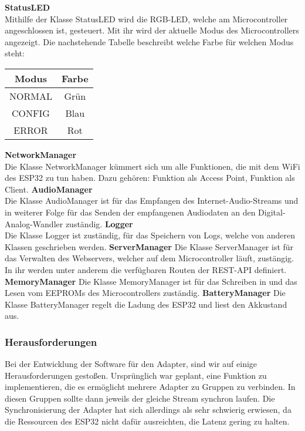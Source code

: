 \documentclass[]{article}
\begin{document}
\textbf{StatusLED} \\
Mithilfe der Klasse StatusLED wird die RGB-LED, welche am Microcontroller angeschlossen ist, gesteuert. Mit ihr wird der aktuelle Modus des Microcontrollers angezeigt. Die nachstehende Tabelle beschreibt welche Farbe für welchen Modus steht: \\
\begin{tabularx}{\textwidth}{ |c|c| }
\hline
\textbf{Modus} & \textbf{Farbe} \\
\hline
NORMAL & Grün \\
\hline
CONFIG & Blau \\
\hline
ERROR & Rot \\
\hline
\end{tabularx}
\textbf{NetworkManager} \\
Die Klasse NetworkManager kümmert sich um alle Funktionen, die mit dem WiFi des ESP32 zu tun haben. Dazu gehören: Funktion als Access Point, Funktion als Client.
\vspace{4mm}\newline
\textbf{AudioManager} \\
Die Klasse AudioManager ist für das Empfangen des Internet-Audio-Streams und in weiterer Folge für das Senden der empfangenen Audiodaten an den Digital-Analog-Wandler zuständig.
\vspace{4mm}\newline
\textbf{Logger} \\
Die Klasse Logger ist zuständig, für das Speichern von Logs, welche von anderen Klassen geschrieben werden. 
\vspace{4mm}\newline
\textbf{ServerManager}
Die Klasse ServerManager ist für das Verwalten des Webservers, welcher auf dem Microcontroller läuft, zustängig. In ihr werden unter anderem die verfügbaren Routen der REST-API definiert.
\vspace{4mm}\newline
\textbf{MemoryManager}
Die Klasse MemoryManager ist für das Schreiben in und das Lesen vom EEPROMs des Microcontrollers zuständig.
\textbf{BatteryManager}
Die Klasse BatteryManager regelt die Ladung des ESP32 und liest den Akkustand aus.
\subsubsection{Herausforderungen}
Bei der Entwicklung der Software für den Adapter, sind wir auf einige Herausforderungen gestoßen. Ursprünglich war geplant, eine Funktion zu implementieren, die es ermöglicht mehrere Adapter zu Gruppen zu verbinden. In diesen Gruppen sollte dann jeweils der gleiche Stream synchron laufen. Die Synchronisierung der Adapter hat sich allerdings als sehr schwierig erwiesen, da die Ressourcen des ESP32 nicht dafür ausreichten, die Latenz gering zu halten.
\end{document}
